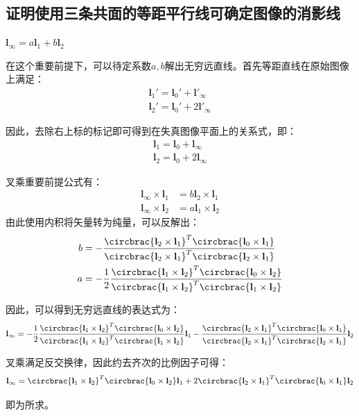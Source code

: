 \documentclass[11pt]{article}
\begin{document}
\subsection{证明使用三条共面的等距平行线可确定图像的消影线}
$\mathbf{l_\infty}=a\mathbf{l}_1+b\mathbf{l}_2$\par
在这个重要前提下，可以待定系数$a,b$解出无穷远直线。首先等距直线在原始图像上满足：
\begin{align*}
  \mathbf{l}_1'=\mathbf{l}_0'+\mathbf{l'}_\infty \\
  \mathbf{l}_2'=\mathbf{l}_0'+2\mathbf{l'}_\infty 
\end{align*}\par
因此，去除右上标的标记即可得到在失真图像平面上的关系式，即：
\begin{align*}
  \mathbf{l}_1=\mathbf{l}_0+{\mathbf{l}_\infty  } \\
  \mathbf{l}_2=\mathbf{l}_0+{2\mathbf{l}_\infty  }
\end{align*}\par
叉乘重要前提公式有：
\begin{align*}
  \mathbf{l}_\infty\times\mathbf{l}_1 & =b\mathbf{l}_2\times\mathbf{l}_1 \\
  \mathbf{l}_\infty\times\mathbf{l}_2 & =a\mathbf{l}_1\times\mathbf{l}_2
\end{align*}
由此使用内积将矢量转为纯量，可以反解出：
\begin{align*}
  b & =-\frac{\circbrac{\mathbf{l}_2\times\mathbf{l}_1}^T\circbrac{\mathbf{l}_0\times\mathbf{l}_1}}{\circbrac{\mathbf{l}_2\times\mathbf{l}_1}^T\circbrac{\mathbf{l}_2\times\mathbf{l}_1}}            \\
  a & =-\frac{1}{2}\frac{\circbrac{\mathbf{l}_1\times\mathbf{l}_2}^T\circbrac{\mathbf{l}_0\times\mathbf{l}_2}}{\circbrac{\mathbf{l}_1\times\mathbf{l}_2}^T\circbrac{\mathbf{l}_1\times\mathbf{l}_2}}
\end{align*}\par
因此，可以得到无穷远直线的表达式为：
\begin{equation*}
  \mathbf{l}_\infty=-\frac{1}{2}\frac{\circbrac{\mathbf{l}_1\times\mathbf{l}_2}^T\circbrac{\mathbf{l}_0\times\mathbf{l}_2}}{\circbrac{\mathbf{l}_1\times\mathbf{l}_2}^T\circbrac{\mathbf{l}_1\times\mathbf{l}_2}}\mathbf{l}_1-\frac{\circbrac{\mathbf{l}_2\times\mathbf{l}_1}^T\circbrac{\mathbf{l}_0\times\mathbf{l}_1}}{\circbrac{\mathbf{l}_2\times\mathbf{l}_1}^T\circbrac{\mathbf{l}_2\times\mathbf{l}_1}}\mathbf{l}_2
\end{equation*}\par
叉乘满足反交换律，因此约去齐次的比例因子可得：
\begin{equation*}
  \mathbf{l}_\infty=\circbrac{\mathbf{l}_1\times\mathbf{l}_2}^T\circbrac{\mathbf{l}_0\times\mathbf{l}_2}\mathbf{l}_1+2\circbrac{\mathbf{l}_2\times\mathbf{l}_1}^T\circbrac{\mathbf{l}_0\times\mathbf{l}_1}\mathbf{l}_2
\end{equation*}\par
即为所求。
\end{document}
